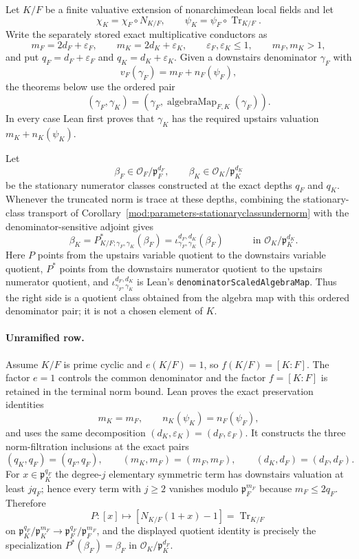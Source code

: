 \begin{theorem}
\label{mod:parameters-highunramifiedstable}
Let $K/F$ be a finite valuative extension of nonarchimedean local fields and
let
\[
 \chi_K=\chi_F\circ N_{K/F},\qquad
 \psi_K=\psi_F\circ\operatorname{Tr}_{K/F}.
\]
Write the separately stored exact multiplicative conductors as
\[
 m_F=2d_F+\varepsilon_F,\qquad
 m_K=2d_K+\varepsilon_K,\qquad
 \varepsilon_F,\varepsilon_K\leq1,\qquad m_F,m_K>1,
\]
and put $q_F=d_F+\varepsilon_F$ and
$q_K=d_K+\varepsilon_K$.  Given a downstairs denominator $\gamma_F$ with
\[
 v_F(\gamma_F)=m_F+n_F(\psi_F),
\]
the theorems below use the ordered pair
\[
 (\gamma_F,\gamma_K)
   =(\gamma_F,\operatorname{algebraMap}_{F,K}(\gamma_F)).
\]
In every case Lean first proves that $\gamma_K$ has the required upstairs
valuation $m_K+n_K(\psi_K)$.

Let
\[
 \beta_F\in\mathcal O_F/\mathfrak p_F^{d_F},\qquad
 \beta_K\in\mathcal O_K/\mathfrak p_K^{d_K}
\]
be the stationary numerator classes constructed at the exact depths $q_F$
and $q_K$.  Whenever the truncated norm is trace at these depths, combining
the stationary-class transport of
Corollary~\ref{mod:parameters-stationaryclassundernorm} with the
denominator-sensitive adjoint gives
\[
 \boxed{\quad
 \beta_K=
 P^*_{K/F;\gamma_F,\gamma_K}(\beta_F)
 =\iota^{d_F,d_K}_{\gamma_F,\gamma_K}(\beta_F)
 \quad}
 \qquad\text{in }\mathcal O_K/\mathfrak p_K^{d_K}.
\]
Here $P$ points from the upstairs variable quotient to the downstairs
variable quotient, $P^*$ points from the downstairs numerator quotient to
the upstairs numerator quotient, and
$\iota^{d_F,d_K}_{\gamma_F,\gamma_K}$ is Lean's
\texttt{denominatorScaledAlgebraMap}.  Thus the right side is a quotient
class obtained from the algebra map with this ordered denominator pair; it
is not a chosen element of $K$.

\paragraph{Unramified row.}
Assume $K/F$ is prime cyclic and $e(K/F)=1$, so
$f(K/F)=[K:F]$.  The factor $e=1$ controls the common denominator and the
factor $f=[K:F]$ is retained in the terminal norm bound.  Lean proves the exact
preservation identities
\[
 m_K=m_F,\qquad n_K(\psi_K)=n_F(\psi_F),
\]
and uses the same decomposition $(d_K,\varepsilon_K)=(d_F,\varepsilon_F)$.
It constructs the three norm-filtration inclusions at the exact pairs
\[
 (q_K,q_F)=(q_F,q_F),\qquad (m_K,m_F)=(m_F,m_F),
 \qquad(d_K,d_F)=(d_F,d_F).
\]
For $x\in\mathfrak p_K^{q_F}$ the degree-$j$ elementary symmetric term has
downstairs valuation at least $j q_F$; hence every term with $j\geq2$
vanishes modulo $\mathfrak p_F^{m_F}$ because $m_F\leq2q_F$.  Therefore
\[
 P:[x]\longmapsto[N_{K/F}(1+x)-1]
   =\operatorname{Tr}_{K/F}
\]
on
$\mathfrak p_K^{q_F}/\mathfrak p_K^{m_F}
 \to\mathfrak p_F^{q_F}/\mathfrak p_F^{m_F}$, and the displayed quotient
identity is precisely the specialization $P^*(\beta_F)=\beta_F$ in
$\mathcal O_K/\mathfrak p_K^{d_F}$.


\end{theorem}
